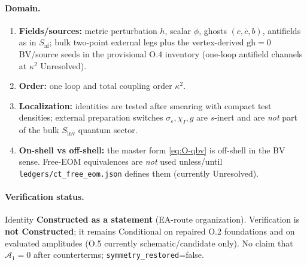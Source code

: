 \paragraph{Domain.}
\begin{enumerate}
\item \textbf{Fields/sources:} metric perturbation $h$, scalar $\phi$, ghosts
$(c,\bar c,b)$, antifields as in $S_{\mathrm{af}}$; bulk two-point external legs plus the
vertex-derived $\mathrm{gh}=0$ BV/source seeds in the provisional O.4 inventory
(one-loop antifield channels at $\kappa^2$ Unresolved).
\item \textbf{Order:} one loop and total coupling order $\kappa^2$.
\item \textbf{Localization:} identities are tested after smearing with compact test densities;
external preparation switches $\sigma_\varepsilon,\chi_I,g$ are $s$-inert and are \emph{not}
part of the bulk $S_{\mathrm{inv}}$ quantum sector.
\item \textbf{On-shell vs off-shell:} the master form \eqref{eq:O-qbv} is off-shell in the
BV sense. Free-EOM equivalences are \emph{not} used unless/until
\texttt{ledgers/ct\_free\_eom.json} defines them (currently Unresolved).
\end{enumerate}

\paragraph{Verification status.}
Identity \textbf{Constructed as a statement} (EA-route organization). Verification is
\textbf{not Constructed}; it remains Conditional on repaired O.2 foundations and on
evaluated amplitudes (O.5 currently schematic/candidate only).
No claim that $\mathcal A_1=0$ after counterterms; \texttt{symmetry\_restored}=false.
